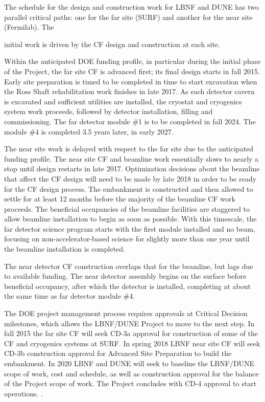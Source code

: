 The schedule for the design and construction work for LBNF and DUNE has two parallel critical paths: one for the %
far site (SURF) and %
another for the %
near site (Fermilab). The { initial work is driven by the CF design and construction at each site. 

Within the anticipated DOE funding profile, in particular during the initial phase of the Project, the far site CF is advanced first; its final design starts in fall 2015. Early site preparation is timed to be completed %
in time to start excavation when the Ross Shaft rehabilitation work finishes %
 in late 2017. As each detector %
 cavern is excavated and sufficient utilities are installed, the cryostat and cryogenics system work proceeds, followed by detector installation, filling and commissioning. The far detector module \#1 is to be completed in fall 2024. The module \#4 is completed 3.5 years later, in early 2027. 

The near site work is delayed with respect to the far site due to the anticipated funding profile. The near site CF and beamline work essentially slows to nearly a stop %
until design restarts in late 2017. Optimization decisions about the beamline that affect the CF design will need to be made by late 2018 in order to be ready for the CF design process. The embankment is constructed and then allowed to settle for at least 12 months before the majority of the beamline CF work proceeds. The beneficial occupancies of the  beamline facilities %
are staggered to allow beamline installation to begin as soon as possible. With this timescale, the far detector science program %
starts with the first module installed and no beam, focusing on non-accelerator-based science %
for slightly more than one year until 
the beamline installation is completed.


The near detector CF construction overlaps that for the beamline, but lags due to available funding. The near detector assembly begins on the surface before beneficial occupancy, after which the detector is installed, completing at about the same time as far detector module \#4. 

The DOE project management process requires approvals at Critical Decision milestones, which allows the LBNF/DUNE Project to move to the next step. In fall 2015 the far site CF will seek CD-3a approval for construction of some of the CF and cryogenics systems at SURF. In spring 2018 LBNF near site CF will seek CD-3b construction approval for Advanced Site Preparation to build the embankment. In 2020 LBNF and DUNE will seek to baseline the LBNF/DUNE scope of work, cost and schedule, as well as construction approval for the balance of the Project scope of work. %
The Project concludes with CD-4 approval to start operations.
. 


}
